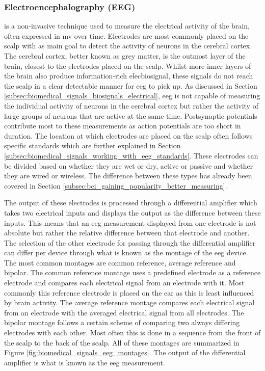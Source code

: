\subsubsection{Electroencephalography (EEG)}
\label{subsubsec:biomedical_signals_measuring_brain_modalities_eeg}

 is a non-invasive technique used to measure the electrical activity of the brain, often expressed in \gls{mv} over time.
Electrodes are most commonly placed on the scalp with as main goal to detect the activity of neurons in the cerebral cortex.
The cerebral cortex, better known as grey matter, is the outmost layer of the brain, closest to the electrodes placed on the scalp.
Whilst more inner layers of the brain also produce information-rich \gls{elecbiosignal}, these signals do not reach the scalp in a clear detectable manner for \gls{eeg} to pick up.
As discussed in Section \ref{subsec:biomedical_signals_biosignals_electrical}, \gls{eeg} is not capable of measuring the individual activity of neurons in the cerebral cortex but rather the activity of large groups of neurons that are active at the same time.
Postsynaptic potentials contribute most to these measurements as action potentials are too short in duration.
The location at which electrodes are placed on the scalp often follows specific standards which are further explained in Section \ref{subsec:biomedical_signals_working_with_eeg_standards}.
These electrodes can be divided based on whether they are wet or dry, active or passive and whether they are wired or wireless.
The difference between these types has already been covered in Section \ref{subsec:bci_gaining_popularity_better_measuring}.

The output of these electrodes is processed through a differential amplifier which takes two electrical inputs and displays the output as the difference between these inputs.
This means that an \gls{eeg} measurement displayed from one electrode is not absolute but rather the relative difference between that electrode and another.
The selection of the other electrode for passing through the differential amplifier can differ per device through what is known as the montage of the \gls{eeg} device.
The most common montages are common reference, average reference and bipolar.
The common reference montage uses a predefined electrode as a reference electrode and compares each electrical signal from an electrode with it.
Most commonly this reference electrode is placed on the ear as this is least influenced by brain activity.
The average reference montage compares each electrical signal from an electrode with the averaged electrical signal from all electrodes.
The bipolar montage follows a certain scheme of comparing two always differing electrodes with each other.
Most often this is done in a sequence from the front of the scalp to the back of the scalp.
All of these montages are summarized in Figure \ref{fig:biomedical_signals_eeg_montages}.
The output of the differential amplifier is what is known as the \gls{eeg} measurement.

